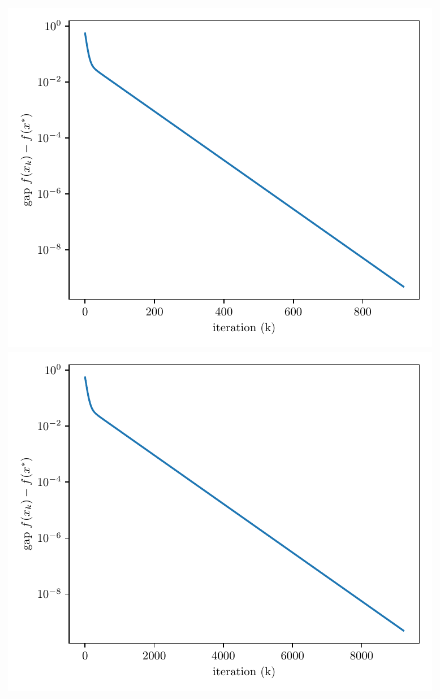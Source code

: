 \documentclass{article}
\begin{document}
\begin{enumerate}[(a).]
\begin{figure}[h]
\begin{minipage}[b]{0.23\linewidth}
			\includegraphics[width=1\linewidth]{gd_f_gamma0.1_ss0.1.pdf}\vspace{4pt}
		\includegraphics[width=1\linewidth]{gd_f_gamma0.1_ss0.01.pdf}
		\end{minipage}
		\begin{minipage}[b]{0.23\linewidth}

\end{minipage}
\end{figure}
\end{enumerate}
\end{document}

